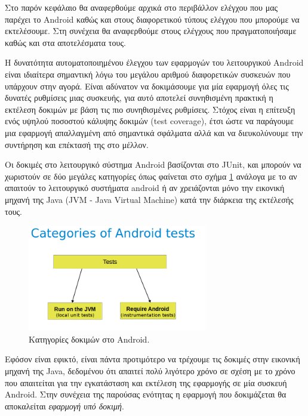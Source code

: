 	Στο παρόν κεφάλαιο θα αναφερθούμε αρχικά στο περιβάλλον ελέγχου που μας παρέχει το Android καθώς και στους διαφορετικού τύπους ελέγχου που μπορούμε να εκτελέσουμε. Στη συνέχεια θα αναφερθούμε στους ελέγχους που πραγματοποιήσαμε καθώς και στα αποτελέσματα τους.
	
	Η δυνατότητα αυτοματοποιημένου έλεγχου των εφαρμογών του λειτουργικού Android είναι ιδιαίτερα σημαντική λόγω του μεγάλου αριθμού διαφορετικών συσκευών που υπάρχουν στην αγορά. Είναι αδύνατον να δοκιμάσουμε για μία εφαρμογή όλες τις δυνατές ρυθμίσεις μιας συσκευής, για αυτό αποτελεί συνηθισμένη πρακτική η εκτέλεση δοκιμών με βάση τις πιο συνηθισμένες ρυθμίσεις. Στόχος είναι η επίτευξη ενός υψηλού ποσοστού κάλυψης δοκιμών (test coverage), έτσι ώστε να παράγουμε μια εφαρμογή απαλλαγμένη από σημαντικά σφάλματα αλλά και να διευκολύνουμε την συντήρηση και επέκτασή της στο μέλλον.
	
	Οι δοκιμές στο λειτουργικό σύστημα Android βασίζονται στο JUnit, και μπορούν να χωριστούν σε δύο μεγάλες κατηγορίες όπως φαίνεται στο σχήμα \ref{fig:categories_of_android_tests} ανάλογα με το αν απαιτούν το λειτουργικό συστήματα android ή αν χρειάζονται μόνο την εικονική μηχανή της Java (JVM - Java Virtual Machine) κατά την διάρκεια της εκτέλεσής τους\cite{androidTesting}.
	
	\begin{figure}[h]
	    \centering
	    \includegraphics[width=0.7\textwidth]{categories_of_android_tests.png}
	    \caption{ Κατηγορίες δοκιμών στο Android.}
	    \label{fig:categories_of_android_tests}
	\end{figure}
	
	Εφόσον είναι εφικτό, είναι πάντα προτιμότερο να τρέχουμε τις δοκιμές στην εικονική μηχανή της Java, δεδομένου ότι απαιτεί πολύ λιγότερο χρόνο σε σχέση με το χρόνο που απαιτείται για την εγκατάσταση και εκτέλεση της εφαρμογής σε μία συσκευή Android. Στην συνέχεια της παρούσας ενότητας η εφαρμογή που δοκιμάζεται θα αποκαλείται \textit{εφαρμογή υπό δοκιμή}.
	
